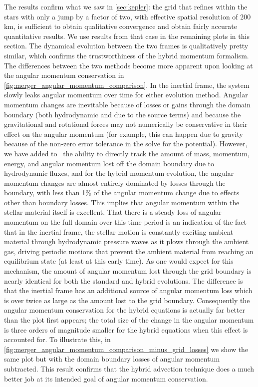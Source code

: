 \documentclass[12pt]{article}
\begin{document}
The results confirm what we saw in \autoref{sec:kepler}: the grid that refines within the stars with
only a jump by a factor of two, with effective spatial resolution of 200 km, is sufficient to obtain
qualitative convergence and obtain fairly accurate quantitative results. We use results from that case
in the remaining plots in this section. The dynamical evolution between the two frames is qualitatively
pretty similar, which confirms the trustworthiness of the hybrid momentum formalism. The differences
between the two methods become more apparent upon looking at the angular momentum conservation in
\autoref{fig:merger_angular_momentum_comparison}. In the inertial frame, the system slowly leaks angular
momentum over time for either evolution method. Angular momentum changes are inevitable because of losses
or gains through the domain boundary (both hydrodynamic and due to the source terms) and because the
gravitational and rotational forces may not numerically be conservative in their effect on the angular
momentum (for example, this can happen due to gravity because of the non-zero error tolerance in the
solve for the potential). However, we have added to \castro\ the ability to directly track the amount
of mass, momentum, energy, and angular momentum lost off the domain boundary due to hydrodynamic fluxes,
and for the hybrid momentum evolution, the angular momentum changes are almost entirely dominated by
losses through the boundary, with less than 1\% of the angular momentum change due to effects other than
boundary losses. This implies that angular momentum within the stellar material itself is excellent.
That there is a steady loss of angular momentum on the full domain over this time period is an indication
of the fact that in the inertial frame, the stellar motion is constantly exciting ambient material through
hydrodynamic pressure waves as it plows through the ambient gas, driving periodic motions that prevent
the ambient material from reaching an equilibrium state (at least at this early time). As one would expect
for this mechanism, the amount of angular momentum lost through the grid boundary is nearly identical for
both the standard and hybrid evolutions. The difference is that the inertial frame has an additional source
of angular momentum loss which is over twice as large as the amount lost to the grid boundary. Consequently
the angular momentum conservation for the hybrid equations is actually far better than the plot first appears;
the total size of the change in the angular momentum is three orders of magnitude smaller for the hybrid equations
when this effect is accounted for. To illustrate this, in \autoref{fig:merger_angular_momentum_comparison_minus_grid_losses}
we show the same plot but with the domain boundary losses of angular momentum subtracted. This result confirms
that the hybrid advection technique does a much better job at its intended goal of angular momentum conservation.
\end{document}
